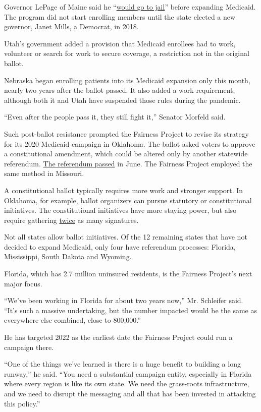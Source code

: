 Governor LePage of Maine said he
``\href{https://apnews.com/b4ccacffb7e445c08f31c4fc444c2d85/LePage-says-he'd-risk-jail-before-Medicaid-puts-Maine-in-red}{would
go to jail}'' before expanding Medicaid. The program did not start
enrolling members until the state elected a new governor, Janet Mills, a
Democrat, in 2018.

Utah's government added a provision that Medicaid enrollees had to work,
volunteer or search for work to secure coverage, a restriction not in
the original ballot.

Nebraska began enrolling patients into its Medicaid expansion only this
month, nearly two years after the ballot passed. It also added a work
requirement, although both it and Utah have suspended those rules during
the pandemic.

``Even after the people pass it, they still fight it,'' Senator Morfeld
said.

Such post-ballot resistance prompted the Fairness Project to revise its
strategy for its 2020 Medicaid campaign in Oklahoma. The ballot asked
voters to approve a constitutional amendment, which could be altered
only by another statewide referendum.
\href{https://www.nytimes3xbfgragh.onion/2020/07/01/upshot/oklahoma-obamacare-Republican-voters-expand.html}{The
referendum passed} in June. The Fairness Project employed the same
method in Missouri.

A constitutional ballot typically requires more work and stronger
support. In Oklahoma, for example, ballot organizers can pursue
statutory or constitutional initiatives. The constitutional initiatives
have more staying power, but also require gathering
\href{https://ballotpedia.org/Laws_governing_the_initiative_process_in_Oklahoma}{twice}
as many signatures.

Not all states allow ballot initiatives. Of the 12 remaining states that
have not decided to expand Medicaid, only four have referendum
processes: Florida, Mississippi, South Dakota and Wyoming.

Florida, which has 2.7 million uninsured residents, is the Fairness
Project's next major focus.

``We've been working in Florida for about two years now,'' Mr. Schleifer
said. ``It's such a massive undertaking, but the number impacted would
be the same as everywhere else combined, close to 800,000.''

He has targeted 2022 as the earliest date the Fairness Project could run
a campaign there.

``One of the things we've learned is there is a huge benefit to building
a long runway,'' he said. ``You need a substantial campaign entity,
especially in Florida where every region is like its own state. We need
the grass-roots infrastructure, and we need to disrupt the messaging and
all that has been invested in attacking this policy.''


